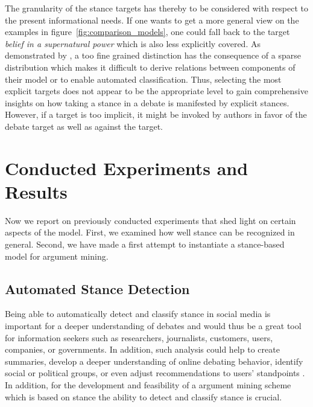 \documentclass[11pt]{article}
\begin{document}

The granularity of the stance targets has thereby to be considered with respect to the present informational needs.
If one wants to get a more general view on the examples in figure~\ref{fig:comparison_models}, one could fall back to the target \textit{belief in a supernatural power} which is also less explicitly covered.
As demonstrated by , a too fine grained distinction has the consequence of a sparse distribution which makes it difficult to derive relations between components of their model or to enable automated classification.
Thus, selecting the most explicit targets does not appear to be the appropriate level to gain comprehensive insights on how taking a stance in a debate is manifested by explicit stances.
However, if a target is too implicit, it might be invoked by authors in favor of the debate target as well as against the target.


\section{Conducted Experiments and Results}
Now we report on previously conducted experiments that shed light on certain aspects of the model.
First, we examined how well stance can be recognized in general.
Second, we have made a first attempt to instantiate a stance-based model for argument mining.

\subsection{Automated Stance Detection}
\label{sec:semeval}
Being able to automatically detect and classify stance in social media is important for a deeper understanding of debates and would thus be a great tool for information seekers such as researchers, journalists, customers, users, companies, or governments.
In addition, such analysis could help to create summaries, develop a deeper understanding of online debating behavior, identify social or political groups, or even adjust recommendations to users' standpoints \cite{anand2011cats,sridhar2014collective,boltuzic2014back}.
In addition, for the development and feasibility of a argument mining scheme which is based on stance the ability to detect and classify stance is crucial.
\end{document}
